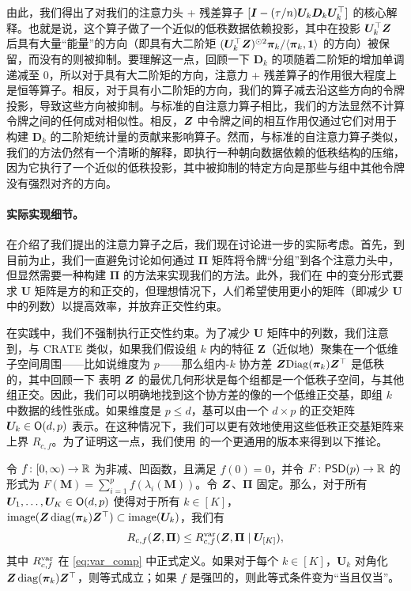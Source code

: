 \documentclass[../../book-main.tex]{subfiles}
\begin{document}
由此，我们得出了对我们的注意力头 + 残差算子 $[\bm{I} - (\tau/n)\bm U_{k}\bm D_{k}\bm U_{k}^{\top}]$ 的核心解释。也就是说，这个算子做了一个近似的低秩数据依赖投影，其中在投影 $\bm U_k^\top \bm{Z}$ 后具有大量“能量”的方向（即具有大二阶矩 $(\bm U_{k}^{\top}\bm{Z})^{\odot 2}\bm \pi_k / \langle \bm \pi_{k}, \bm 1\rangle$ 的方向）被保留，而没有的则被抑制。要理解这一点，回顾一下 $\bm D_k$ 的项随着二阶矩的增加单调递减至 0，所以对于具有大二阶矩的方向，注意力 + 残差算子的作用很大程度上是恒等算子。相反，对于具有小二阶矩的方向，我们的算子减去沿这些方向的令牌投影，导致这些方向被抑制。与标准的自注意力算子相比，我们的方法显然不计算令牌之间的任何成对相似性。相反，$\bm{Z}$ 中令牌之间的相互作用仅通过它们对用于构建 $\bm D_{k}$ 的二阶矩统计量的贡献来影响算子。然而，与标准的自注意力算子类似，我们的方法仍然有一个清晰的解释，即执行一种朝向数据依赖的低秩结构的压缩，因为它执行了一个近似的低秩投影，其中被抑制的特定方向是那些与组中其他令牌没有强烈对齐的方向。

\paragraph{实际实现细节。} 在介绍了我们提出的注意力算子之后，我们现在讨论进一步的实际考虑。首先，到目前为止，我们一直避免讨论如何通过 $\bm\Pi$ 矩阵将令牌“分组”到各个注意力头中，但显然需要一种构建 $\bm\Pi$ 的方法来实现我们的方法。此外，我们在  中的变分形式要求 $\bm U$ 矩阵是方的和正交的，但理想情况下，人们希望使用更小的矩阵（即减少 $\bm U$ 中的列数）以提高效率，并放弃正交性约束。

在实践中，我们不强制执行正交性约束。为了减少 $\bm U$ 矩阵中的列数，我们注意到，与 CRATE \citep{yu2023white} 类似，如果我们假设组 \(k\) 内的特征 $\bm Z$（近似地）聚集在一个低维子空间周围——比如说维度为 \(p\)——那么组内-\(k\) 协方差 \(\bm{Z}\mathrm{Diag}(\bm \pi_{k})\bm{Z}^{\top}\) 是低秩的，其中回顾一下 \cite{yu2020learning} 表明 $\bm{Z}$ 的最优几何形状是每个组都是一个低秩子空间，与其他组正交。因此，我们可以明确地找到这个协方差的像的一个低维正交基，即组 \(k\) 中数据的线性张成。如果维度是 $p \leq d$，基可以由一个 $d\times p$ 的正交矩阵 $\bm U_k \in \mathsf{O}(d, p)$ 表示。在这种情况下，我们可以更有效地使用这些低秩正交基矩阵来上界 \(R_{c,f}\)。为了证明这一点，我们使用  的一个更通用的版本来得到以下推论。
\begin{corollary}\label{cor:var_concave_logdet}
    令 \(f \colon [0, \infty) \to \mathbb{R}\) 为非减、凹函数，且满足 \(f(0) = 0\)，并令 \(F \colon \mathsf{PSD}(p) \to \mathbb{R}\) 的形式为 \(F(\bm M) = \sum_{i = 1}^{p}f(\lambda_{i}(\bm M))\)。令 \(\bm{Z}\)、\(\bm \Pi\) 固定。那么，对于所有 \(\bm U_{1}, \dots, \bm U_{K} \in \mathsf{O}(d, p)\) 使得对于所有 \(k \in [K]\)，\(\mathrm{image}(\bm{Z}\operatorname{diag}(\bm \pi_{k})\bm{Z}^{\top}) \subset \mathrm{image}(\bm U_{k})\)，我们有
    \begin{equation}
        R_{c, f}(\bm{Z}, \bm\Pi) \leq R_{c, f}^{\rm var}(\bm{Z}, \bm\Pi \mid \bm U_{[K]}),
    \end{equation}
     其中 \(R_{c, f}^{\rm var}\) 在 \eqref{eq:var_comp} 中正式定义。如果对于每个 \(k \in [K]\)，\(\bm U_{k}\) 对角化 \(\bm{Z}\operatorname{diag}(\bm \pi_{k})\bm{Z}^{\top}\)，则等式成立；如果 \(f\) 是强凹的，则此等式条件变为“当且仅当”。
\end{corollary}
\end{document}
